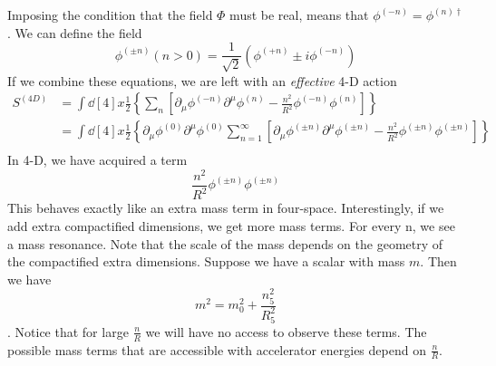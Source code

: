 \documentclass[12pt]{article}
\newcommand{\pd}{\partial}
\begin{document}
Imposing the condition that the field $\Phi$ must be real, means that
$\phi^{(-n)} = \phi^{(n)\dagger}$. We can define the field
\begin{equation}
    \phi^{(\pm n)}(n > 0) = \frac{1}{\sqrt{2}} \left( \phi^{(+n)} \pm i\phi^{(-n)} \right)
\end{equation}
If we combine these equations, we are left with an \textit{effective} 4-D action
\begin{align}
    S^{(4D)} &= \int \dd[4]{x} \frac{1}{2} \left\{ \sum_n \left[
    \pd_\mu\phi^{(-n)}\pd^\mu\phi^{(n)} - \frac{n^2}{R^2}\phi^{(-n)}\phi^{(n)}
\right] \right\} \\
             &= \int \dd[4]{x} \frac{1}{2} \left\{
                 \pd_\mu\phi^{(0)}\pd^\mu\phi^{(0)} \sum_{n=1}^{\infty} \left[
    \pd_\mu\phi^{(\pm n)}\pd^\mu\phi^{(\pm n)} - \frac{n^2}{R^2}\phi^{(\pm
    n)}\phi^{(\pm n)}
\right] \right\} \\
\end{align}
In 4-D, we have acquired a term
\begin{equation}
    \frac{n^2}{R^2}\phi^{(\pm n)}\phi^{(\pm n)}
\end{equation}
This behaves exactly like an extra mass term in four-space. Interestingly, if we
add extra compactified dimensions, we get more mass terms. For every n, we see a
mass resonance. Note that the scale of the mass depends on the geometry of the
compactified extra dimensions. Suppose we have a scalar with mass $m$. Then we
have $$m^2 = m_0^2 + \frac{n_5^2}{R_5^2}$$. Notice that for large $\frac{n}{R}$
we will have no access to observe these terms. The possible mass terms that are
accessible with accelerator energies depend on $\frac{n}{R}$.
\end{document}
